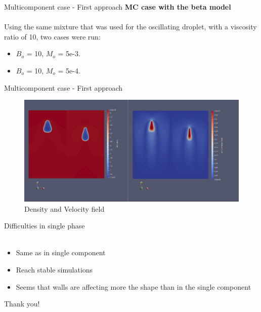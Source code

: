 \documentclass[8pt]{beamer}
\begin{document}
	\begin{frame}{Multicomponent case - First approach}
		\textbf{MC case with the beta model}\\~\\
		Using the same mixture that was used for the oscillating droplet, with a viscosity ratio of 10, two cases were run:
		\begin{itemize}
			\item $B_o$ = 10, $M_o$ = 5e-3.
			\item $B_o$ = 10, $M_o$ = 5e-4.
		\end{itemize}
	\end{frame}
	\begin{frame}{Multicomponent case - First approach}
		\begin{figure}
			\centering
			\includegraphics[scale=0.15]{pics/risingMCComp.png}
			\\{\tiny \justifying Density and Velocity field}
		\end{figure}
	\end{frame}
	
	\begin{frame}{Difficulties in single phase}
		\textbf{}\\~\\
		\begin{itemize}
			\item Same as in single component
			\item Reach stable simulations
			\item Seems that walls are affecting more the shape than in the single component
		\end{itemize}
	\end{frame}
	
	\begin{frame}{}
		\centering
		Thank you!
	\end{frame}


\end{document}
